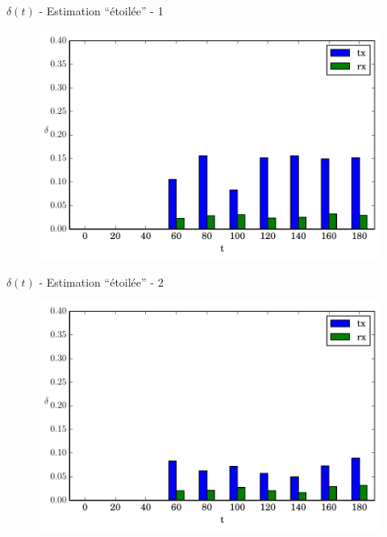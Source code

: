 \begin{frame}{$\delta(t)$ - Estimation ``étoilée'' - 1}
  \begin{figure}
    \centering  
    \includegraphics[width=\textwidth]{figures/evolution_noinfo_1.pdf}
  \end{figure}
\end{frame}

\begin{frame}{$\delta(t)$ - Estimation ``étoilée'' - 2}
  \begin{figure}
    \centering  
    \includegraphics[width=\textwidth]{figures/evolution_noinfo_2.pdf}
  \end{figure}
\end{frame}

